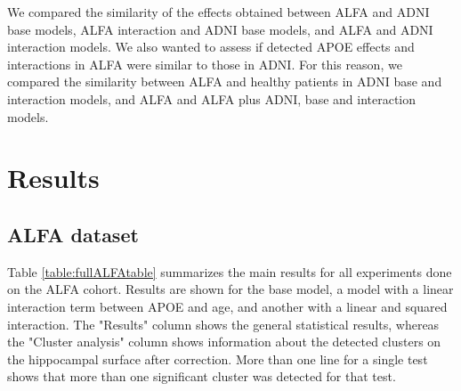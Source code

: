 We compared the similarity of the effects obtained between ALFA and ADNI base models, ALFA interaction and ADNI base models, and ALFA and ADNI interaction models. We also wanted to assess if detected APOE effects and interactions in ALFA were similar to those in ADNI. For this reason, we compared the similarity between ALFA and healthy patients in ADNI base and interaction models, and ALFA and ALFA plus ADNI, base and interaction models.

\section{Results}
\label{sec:results}

\subsection{ALFA dataset}

Table \ref{table:fullALFAtable} summarizes the main results for all experiments done on the ALFA cohort. Results are shown for the base model, a model with a linear interaction term between APOE and age, and another with a linear and squared interaction. The "Results" column shows the general statistical results, whereas the "Cluster analysis" column shows information about the detected clusters on the hippocampal surface after correction. More than one line for a single test shows that more than one significant cluster was detected for that test. \\

